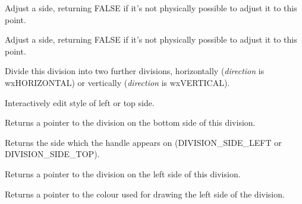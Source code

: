 

Adjust a side, returning FALSE if it's not physically possible to adjust it to this point.



Adjust a side, returning FALSE if it's not physically possible to adjust it to this point.

\label{wxdivisionshapedivide}


Divide this division into two further divisions, horizontally ({\it direction} is wxHORIZONTAL) or
vertically ({\it direction} is wxVERTICAL).



Interactively edit style of left or top side.



Returns a pointer to the division on the bottom side of this division.



Returns the side which the handle appears on (DIVISION\_SIDE\_LEFT or DIVISION\_SIDE\_TOP).



Returns a pointer to the division on the left side of this division.



Returns a pointer to the colour used for drawing the left side of the division.



